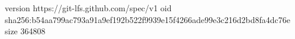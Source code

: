 version https://git-lfs.github.com/spec/v1
oid sha256:b54aa799ac793a91a9ef192b522f9939e15f4266ade99e3c216d2bd8fa4dc76e
size 364808
